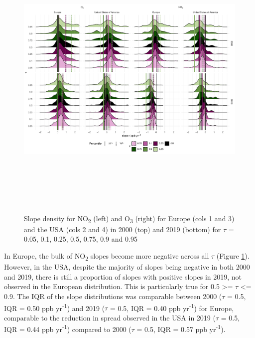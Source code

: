 \documentclass[journal abbreviation, manuscript]{copernicus}
\begin{document}
\begin{figure}
\includegraphics[height=14cm]{figures/f6_ridgelines.pdf}
\caption{Slope density for NO\textsubscript{2} (left) and O\textsubscript{3} (right) for Europe (cols 1 and 3) and the USA (cols 2 and 4) in 2000 (top) and 2019 (bottom) for $\tau$ = 0.05, 0.1, 0.25, 0.5, 0.75, 0.9 and 0.95}
\label{fig:ridgeplot}
\end{figure}


In Europe, the bulk of NO\textsubscript{2} slopes become more negative across all $\tau$ (Figure \ref{fig:ridgeplot}). However, in the USA, despite the majority of slopes being negative in both 2000 and 2019, there is still a proportion of slopes with positive slopes in 2019, not observed in the European distribution. This is particularly true for 0.5 >= $\tau$ <= 0.9. The IQR of the slope distributions was comparable between 2000 ($\tau$ = 0.5, IQR = 0.50 ppb yr\textsuperscript{-1}) and 2019 ($\tau$ = 0.5, IQR = 0.40 ppb yr\textsuperscript{-1}) for Europe, comparable to the reduction in spread observed in the USA in 2019 ($\tau$ = 0.5, IQR = 0.44 ppb yr\textsuperscript{-1}) compared to 2000 ($\tau$ = 0.5, IQR = 0.57 ppb yr\textsuperscript{-1}).
\end{document}
